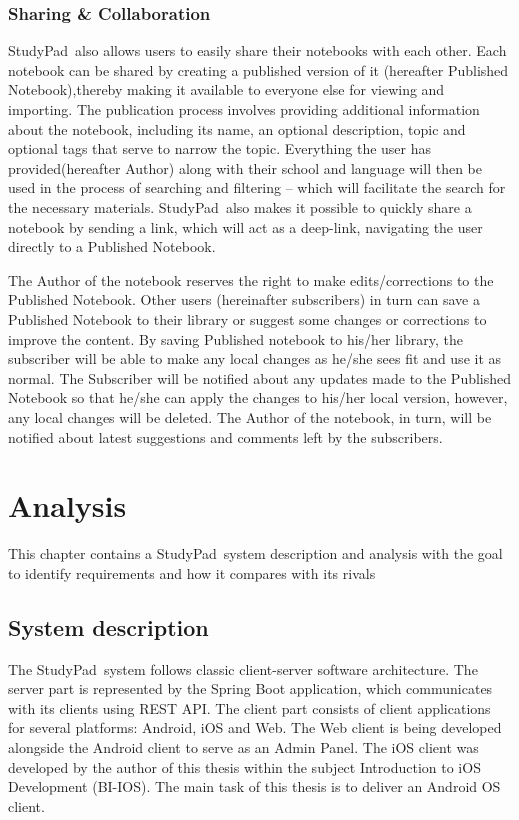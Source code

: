 \documentclass[thesis=B,english]{FITthesis}[2012/10/20]
\newcommand{\appname}{StudyPad}
\begin{document}
\subsection{Sharing \& Collaboration}
\appname\ also allows users to easily share their notebooks with each other. Each notebook can be shared by creating a published version of it (hereafter Published Notebook),thereby making it available to everyone else for viewing and importing.
The publication process involves providing additional information about the notebook, including its name, an optional description, topic and optional tags that serve to narrow the topic. Everything the user has provided(hereafter Author) along with their school and language will then be used in the process of searching and filtering -- which will facilitate the search for the necessary materials. \appname\ also makes it possible to quickly share a notebook by sending a link, which will act as a deep-link, navigating the user directly to a Published Notebook.

The Author of the notebook reserves the right to make edits/corrections to the Published Notebook. Other users (hereinafter subscribers) in turn can save a Published Notebook to their library or suggest some changes or corrections to improve the content. By saving Published notebook to his/her library, the subscriber will be able to make any local changes as he/she sees fit and use it as normal. The Subscriber will be notified about any updates made to the Published Notebook so that he/she can apply the changes to his/her local version, however, any local changes will be deleted. The Author of the notebook, in turn, will be notified about latest suggestions and comments left by the subscribers.

\chapter{Analysis}
This chapter contains a \appname\ system description and analysis with the goal to identify requirements and how it compares with its rivals


\section{System description}

The \appname\ system follows classic client-server software architecture. The server part is represented by the Spring Boot application, which communicates with its clients using REST API. The client part consists of client applications for several platforms: Android, iOS and Web. The Web client is being developed alongside the Android client to serve as an Admin Panel.\cite{studypad-web} The iOS client was developed by the author of this thesis  within the subject Introduction to iOS Development (BI-IOS). \cite{studypad-ios} The main task of this thesis is to deliver an Android OS client.
\end{document}
